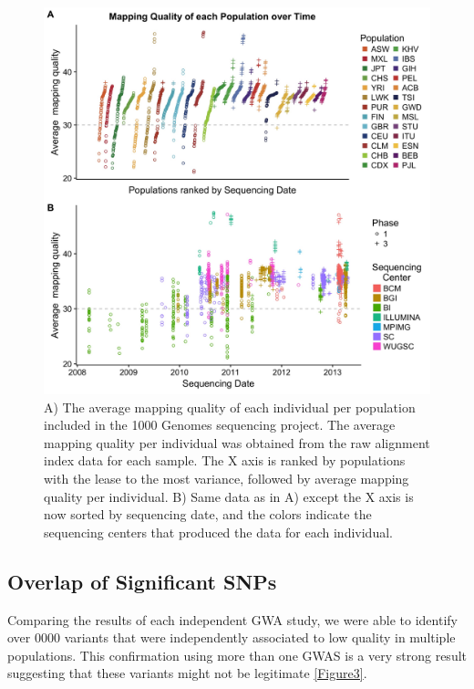 \documentclass[]{elife}
\begin{document}
\begin{figure}
\includegraphics[width=\hsize,keepaspectratio]{MapQualOverTime.jpg}

\caption{A) The average mapping quality of each individual per population included in the 1000 Genomes sequencing project. The average mapping quality per individual was obtained from the raw alignment index data for each sample. The X axis is ranked by populations with the lease to the most variance, followed by average mapping quality per individual. B) Same data as in A) except the X axis is now sorted by sequencing date, and the colors indicate the sequencing centers that produced the data for each individual.}
\label{Figure1}
\end{figure}

	\subsection{Overlap of Significant SNPs}
Comparing the results of each independent GWA study, we were able to identify over 0000 variants that were independently associated to low quality in multiple populations. This confirmation using more than one GWAS is a very strong result suggesting that these variants might not be legitimate  \ref{Figure3}. 
\end{document}
